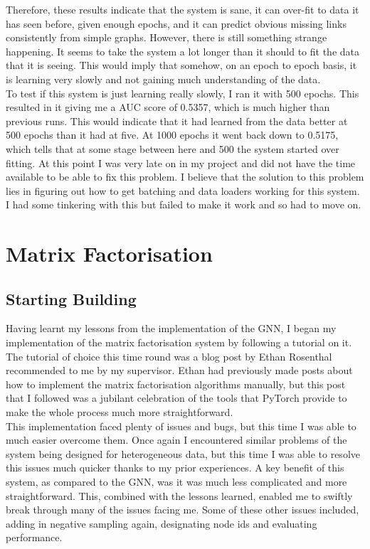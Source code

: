 \documentclass{l4proj}
\begin{document}
Therefore, these results indicate that the system is sane, it can over-fit to data it has seen before, given enough epochs, and it can predict obvious missing links consistently from simple graphs. However, there is still something strange happening. It seems to take the system a lot longer than it should to fit the data that it is seeing. This would imply that somehow, on an epoch to epoch basis, it is learning very slowly and not gaining much understanding of the data. \\

To test if this system is just learning really slowly, I ran it with 500 epochs. This resulted in it giving me a AUC score of 0.5357, which is much higher than previous runs. This would indicate that it had learned from the data better at 500 epochs than it had at five. At 1000 epochs it went back down to 0.5175, which tells that at some stage between here and 500 the system started over fitting. At this point I was very late on in my project and did not have the time available to be able to fix this problem. I believe that the solution to this problem lies in figuring out how to get batching and data loaders working for this system. I had some tinkering with this but failed to make it work and so had to move on. \\

\section{Matrix Factorisation}

\subsection{Starting Building}

Having learnt my lessons from the implementation of the GNN, I began my implementation of the matrix factorisation system by following a tutorial on it. The tutorial of choice this time round was a blog post by Ethan Rosenthal recommended to me by my supervisor. Ethan had previously made posts about how to implement the matrix factorisation algorithms manually, but this post that I followed was a jubilant celebration of the tools that PyTorch provide to make the whole process much more straightforward. \\

This implementation faced plenty of issues and bugs, but this time I was able to much easier overcome them. Once again I encountered similar problems of the system being designed for heterogeneous data, but this time I was able to resolve this issues much quicker thanks to my prior experiences. A key benefit of this system, as compared to the GNN, was it was much less complicated and more straightforward. This, combined with the lessons learned, enabled me to swiftly break through many of the issues facing me. Some of these other issues included, adding in negative sampling again, designating node ids and evaluating performance. \\
\end{document}
